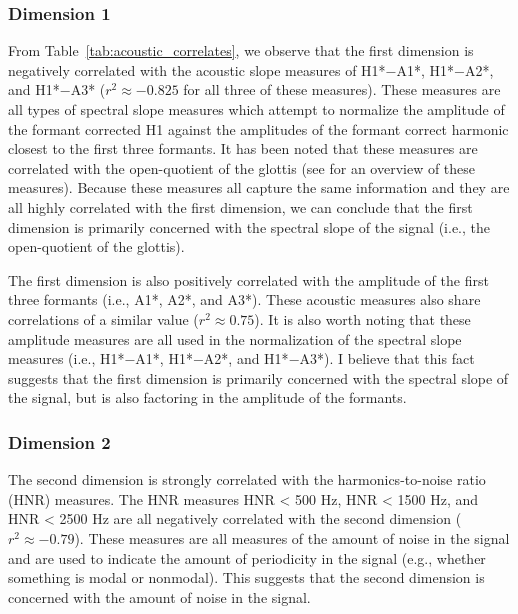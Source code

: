 \subsubsection{Dimension 1} \label{sec:acousticlandscape:dim1}
From Table~\ref{tab:acoustic_correlates}, we observe that the first dimension is negatively correlated with the acoustic slope measures of H1*$-$A1*, H1*$-$A2*, and H1*$-$A3* ($r^{2} \approx -0.825$ for all three of these measures). These measures are all types of spectral slope measures which attempt to normalize the amplitude of the formant corrected H1 against the amplitudes of the formant correct harmonic closest to the first three formants. It has been noted that these measures are correlated with the open-quotient of the glottis (see \cite{garellekPhoneticsVoice2019,garellekTheoreticalAchievementsPhonetics2022} for an overview of these measures). Because these measures all capture the same information and they are all highly correlated with the first dimension, we can conclude that the first dimension is primarily concerned with the spectral slope of the signal (i.e., the open-quotient of the glottis). 

The first dimension is also positively correlated with the amplitude of the first three formants (i.e., A1*, A2*, and A3*). These acoustic measures also share correlations of a similar value ($r^{2} \approx 0.75$). It is also worth noting that these amplitude measures are all used in the normalization of the spectral slope measures (i.e., H1*$-$A1*, H1*$-$A2*, and H1*$-$A3*). I believe that this fact suggests that the first dimension is primarily concerned with the spectral slope of the signal, but is also factoring in the amplitude of the formants.

\subsubsection{Dimension 2} \label{sec:acousticlandscape:dim2}
The second dimension is strongly correlated with the harmonics-to-noise ratio (HNR) measures. The HNR measures HNR < 500 Hz, HNR < 1500 Hz, and HNR < 2500 Hz are all negatively correlated with the second dimension ($r^{2} \approx -0.79$). These measures are all measures of the amount of noise in the signal and are used to indicate the amount of periodicity in the signal (e.g., whether something is modal or nonmodal). This suggests that the second dimension is concerned with the amount of noise in the signal.


